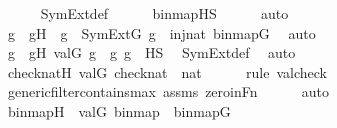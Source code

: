 \begin{isabellebody}
\ \ \ \ \isamarkupfalse%
\ SymExt{\isacharunderscore}{\kern0pt}def\isanewline
\ \ \ \ \isamarkupfalse%
\ binmap{\isacharprime}{\kern0pt}{\isacharunderscore}{\kern0pt}HS\isanewline
\ \ \ \ \isamarkupfalse%
\ auto\isanewline
\ \ \isamarkupfalse%
\ \isamarkupfalse%
\ g\ \ gH\ {\isacharcolon}{\kern0pt}\ {\isachardoublequoteopen}g\ {\isasymin}\ SymExt{\isacharparenleft}{\kern0pt}G{\isacharparenright}{\kern0pt}{\isachardoublequoteclose}\ {\isachardoublequoteopen}g\ {\isasymin}\ inj{\isacharparenleft}{\kern0pt}nat{\isacharcomma}{\kern0pt}\ binmap{\isacharparenleft}{\kern0pt}G{\isacharparenright}{\kern0pt}{\isacharparenright}{\kern0pt}{\isachardoublequoteclose}\ \isamarkupfalse%
\ auto\isanewline
\isanewline
\ \ \isamarkupfalse%
\ \isamarkupfalse%
\ g{\isacharprime}{\kern0pt}\ \ g{\isacharprime}{\kern0pt}H{\isacharcolon}{\kern0pt}\ {\isachardoublequoteopen}val{\isacharparenleft}{\kern0pt}G{\isacharcomma}{\kern0pt}\ g{\isacharprime}{\kern0pt}{\isacharparenright}{\kern0pt}\ {\isacharequal}{\kern0pt}\ g{\isachardoublequoteclose}\ {\isachardoublequoteopen}g{\isacharprime}{\kern0pt}\ {\isasymin}\ HS{\isachardoublequoteclose}\ \isamarkupfalse%
\ SymExt{\isacharunderscore}{\kern0pt}def\ \isamarkupfalse%
\ auto\isanewline
\ \ \isamarkupfalse%
\ checknatH{\isacharcolon}{\kern0pt}\ {\isachardoublequoteopen}val{\isacharparenleft}{\kern0pt}G{\isacharcomma}{\kern0pt}\ check{\isacharparenleft}{\kern0pt}nat{\isacharparenright}{\kern0pt}{\isacharparenright}{\kern0pt}\ {\isacharequal}{\kern0pt}\ nat{\isachardoublequoteclose}\ \isanewline
\ \ \ \ \isamarkupfalse%
{\isacharparenleft}{\kern0pt}rule\ valcheck{\isacharparenright}{\kern0pt}\isanewline
\ \ \ \ \isamarkupfalse%
\ generic{\isacharunderscore}{\kern0pt}filter{\isacharunderscore}{\kern0pt}contains{\isacharunderscore}{\kern0pt}max\ assms\ zero{\isacharunderscore}{\kern0pt}in{\isacharunderscore}{\kern0pt}Fn\isanewline
\ \ \ \ \isamarkupfalse%
\ auto\isanewline
\ \ \isamarkupfalse%
\ binmap{\isacharprime}{\kern0pt}H\ {\isacharcolon}{\kern0pt}\ {\isachardoublequoteopen}val{\isacharparenleft}{\kern0pt}G{\isacharcomma}{\kern0pt}\ binmap{\isacharprime}{\kern0pt}{\isacharparenright}{\kern0pt}\ {\isacharequal}{\kern0pt}\ binmap{\isacharparenleft}{\kern0pt}G{\isacharparenright}{\kern0pt}{\isachardoublequoteclose}\ \isanewline
\ \ \ \ \isamarkupfalse%

\end{isabellebody}
